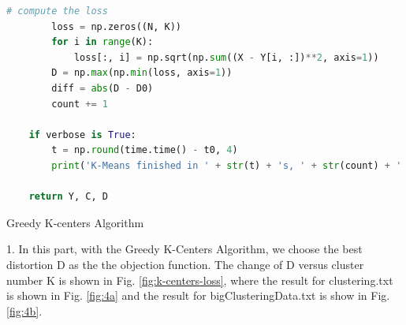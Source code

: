 \begin{description}
\begin{description}
\begin{lstlisting}[language=Python, caption={K-Means Algorithm Python Code}]
        # compute the loss
        loss = np.zeros((N, K))
        for i in range(K):
            loss[:, i] = np.sqrt(np.sum((X - Y[i, :])**2, axis=1))
        D = np.max(np.min(loss, axis=1))
        diff = abs(D - D0)
        count += 1

    if verbose is True:
        t = np.round(time.time() - t0, 4)
        print('K-Means finished in ' + str(t) + 's, ' + str(count) + ' iters')

    return Y, C, D
\end{lstlisting}

\end{description}

\newpage
\item[\Romannum{2}.] Greedy K-centers Algorithm

\begin{description}
\item{1.} In this part, with the Greedy K-Centers Algorithm, we choose the best distortion D as the the objection function. The change of D versus cluster number K is shown in Fig. \ref{fig:k-centers-loss}, where the result for clustering.txt is shown in Fig. \ref{fig:4a} and the result for bigClusteringData.txt is show in Fig. \ref{fig:4b}.


\end{description}
\end{description}

